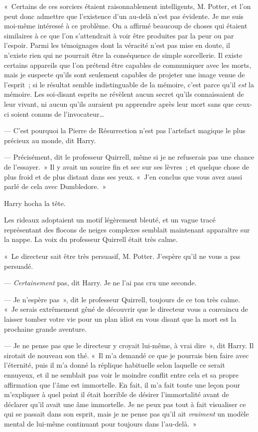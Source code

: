 «~Certains de ces sorciers étaient raisonnablement intelligents, M. Potter, et l'on peut donc admettre que l'existence d'un au-delà n'est pas évidente. Je me suis moi-même intéressé à ce problème. On a affirmé beaucoup de choses qui étaient similaires à ce que l'on s'attendrait à voir être produites par la peur ou par l'espoir. Parmi les témoignages dont la véracité n'est pas mise en doute, il n'existe rien qui ne pourrait être la conséquence de simple sorcellerie. Il existe certains appareils que l'on prétend être capables de communiquer avec les morts, mais je suspecte qu'ils sont seulement capables de projeter une image venue de l'esprit~; si le résultat semble indistinguable de la mémoire, c'est parce qu'il \emph{est} la mémoire. Les soi-disant esprits ne révèlent aucun secret qu'ils connaissaient de leur vivant, ni aucun qu'ils auraient pu apprendre après leur mort sans que ceux-ci soient connus de l'invocateur…

--- C'est pourquoi la Pierre de Résurrection n'est pas l'artefact magique le plus précieux au monde, dit Harry.

--- Précisément, dit le professeur Quirrell, même si je ne refuserais pas une chance de l'essayer.~» Il y avait un sourire fin et sec sur ses lèvres~; et quelque chose de plus froid et de plus distant dans ses yeux. «~J'en conclus que vous avez aussi parlé de cela avec Dumbledore.~»

Harry hocha la tête.

Les rideaux adoptaient un motif légèrement bleuté, et un vague tracé représentant des flocons de neiges complexes semblait maintenant apparaître sur la nappe. La voix du professeur Quirrell était très calme.

«~Le directeur sait être très persuasif, M. Potter. J'espère qu'il ne vous a pas persuadé.

--- \emph{Certainement} pas, dit Harry. Je ne l'ai pas cru une seconde.

--- Je n'espère pas~», dit le professeur Quirrell, toujours de ce ton très calme. «~Je serais extrêmement gêné de découvrir que le directeur vous a convaincu de laisser tomber votre vie pour un plan idiot en vous disant que la mort est la prochaine grande aventure.

--- Je ne pense pas que le directeur y croyait lui-même, à vrai dire~», dit Harry. Il sirotait de nouveau son thé. «~Il m'a demandé ce que je pourrais bien faire avec l'éternité, puis il m'a donné la réplique habituelle selon laquelle ce serait ennuyeux, et il ne semblait pas voir le moindre conflit entre cela et sa propre affirmation que l'âme est immortelle. En fait, il m'a fait toute une leçon pour m'expliquer à quel point il était horrible de désirer l'immortalité avant de déclarer qu'il avait une âme immortelle. Je ne peux pas tout à fait visualiser ce qui se passait dans son esprit, mais je ne pense pas qu'il ait \emph{vraiment} un modèle mental de lui-même continuant pour toujours dans l'au-delà.~»

